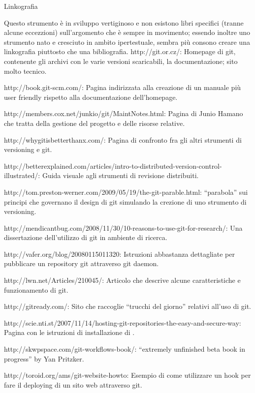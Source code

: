 \capitolo Linkografia

Questo strumento \`e in sviluppo vertiginoso e non esistono libri specifici
(tranne alcune eccezzioni) sull'argomento che \`e sempre in movimento; essendo
inoltre uno strumento nato e cresciuto in ambito ipertestuale, sembra pi\`u
consono creare una linkografia piuttosto che una bibliografia.
\bigskip
\link http://git.or.cz/: Homepage di git, contenente gli archivi con le varie
versioni scaricabili, la documentazione; sito molto tecnico.

\link http://book.git-scm.com/: Pagina indirizzata alla creazione di un manuale
pi\`u user friendly rispetto alla documentazione dell'homepage.

\link http://members.cox.net/junkio/git/MaintNotes.html: Pagina di Junio Hamano che tratta della gestione del progetto e delle risorse relative.

\link http://whygitisbetterthanx.com/: Pagina di confronto fra gli altri
strumenti di versioning e git.

\link
http://betterexplained.com/articles/intro-to-distributed-version-control-illustrated/:
Guida visuale agli strumenti di revisione distribuiti.

\link http://tom.preston-werner.com/2009/05/19/the-git-parable.html:
``parabola'' sui principi che governano il design di git simulando la crezione di uno
strumento di versioning.

\link http://mendicantbug.com/2008/11/30/10-reasons-to-use-git-for-research/:
Una dissertazione dell'utilizzo di git in ambiente di ricerca.

\link http://vafer.org/blog/20080115011320:
Istruzioni abbastanza dettagliate per pubblicare un repository git attraverso
git daemon.

\link http://lwn.net/Articles/210045/: Articolo che descrive alcune
caratteristiche e funzionamento di git.

\link http://gitready.com/: Sito che raccoglie ``trucchi del giorno''
relativi all'uso di git.

\link
http://scie.nti.st/2007/11/14/hosting-git-repositories-the-easy-and-secure-way: Pagina con le istruzioni di installazione di .

\link http://skwpspace.com/git-workflows-book/: ``extremely unfinished beta book
in progress'' by Yan Pritzker.

\link http://toroid.org/ams/git-website-howto: Esempio di come utilizzare un
hook per fare il deploying di un sito web attraverso git.

